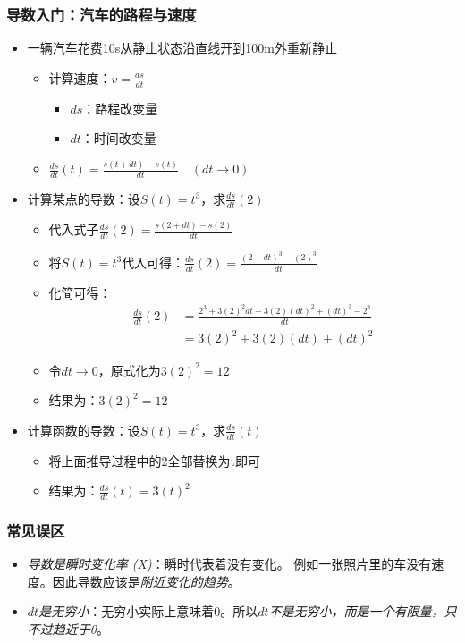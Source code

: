 \documentclass[UTF8]{ctexart}
\begin{document}
\subsubsection{导数入门：汽车的路程与速度}
\begin{itemize}
	\item 一辆汽车花费10s从静止状态沿直线开到100m外重新静止 \begin{itemize}
		\item 计算速度：$v = \frac{ds}{dt}$ \begin{itemize}
			\item $ds$：路程改变量
			\item $dt$：时间改变量
		\end{itemize}
		\item $\frac{ds}{dt}(t) = \frac{s(t+dt)-s(t)}{dt} \quad (dt\to0)$
	\end{itemize}
	\item 计算某点的导数：设$S(t) = t^3$，求$\frac{ds}{dt}(2)$ \begin{itemize}
		\item 代入式子$\frac{ds}{dt}(2) = \frac{s(2+dt)-s(2)}{dt}$
		\item 将$S(t) = t^3$代入可得：$\frac{ds}{dt}(2) = \frac{(2+dt)^3-(2)^3}{dt}$
		\item 化简可得：\begin{align*}
			\frac{ds}{dt}(2) &= \frac{2^3 + 3(2)^2dt + 3(2)(dt)^2 + (dt)^3 - 2^3}{dt} \\ &= 3(2)^2 + 3(2)(dt) + (dt)^2
		\end{align*}
		\item 令$dt\to0$，原式化为$3(2)^2 = 12$
		\item 结果为：$3(2)^2 = 12$
	\end{itemize}
	\item 计算函数的导数：设$S(t) = t^3$，求$\frac{ds}{dt}(t)$ \begin{itemize}
		\item 将上面推导过程中的2全部替换为t即可
		\item 结果为：$\frac{ds}{dt}(t) = 3(t)^2$
	\end{itemize}
\end{itemize}

\subsubsection{常见误区}
\begin{itemize}
	\item \emph{导数是瞬时变化率 (X)}：瞬时代表着没有变化。
	例如一张照片里的车没有速度。因此导数应该是\emph{附近变化的趋势}。
	\item \emph{$dt$是无穷小}：无穷小实际上意味着0。所以\emph{$dt$不是无穷小，而是一个有限量，只不过趋近于0}。
\end{itemize}
\end{document}

